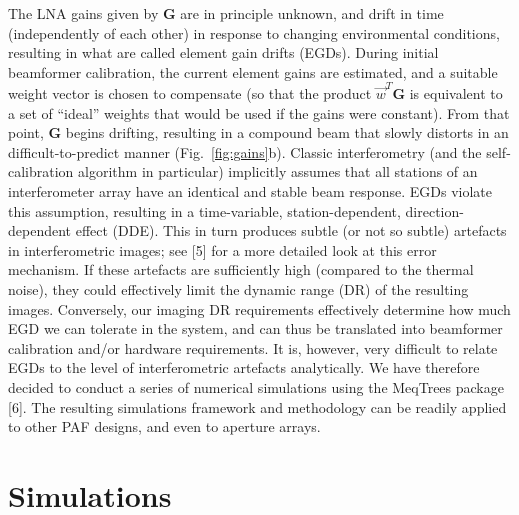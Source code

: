 \documentclass{aps2010} \special{papersize=8.5in,11in}
\begin{document}
The LNA gains given by $\mathbf{G}$ are in principle unknown, and drift in time (independently of each other) in response to changing environmental conditions, resulting in what are called element gain drifts (EGDs). During initial beamformer calibration, the current element gains are estimated, and a suitable weight vector is chosen to compensate (so that the product $\vec w^T\mathbf{G}$ is equivalent to a set of ``ideal'' weights that would be used if the gains were constant). From that point, $\mathbf{G}$ begins drifting, resulting in a compound beam that slowly distorts in an difficult-to-predict manner (Fig.~\ref{fig:gains}b). Classic interferometry (and the self-calibration algorithm in particular) implicitly assumes that all stations of an interferometer array have an identical and stable beam response. EGDs violate this assumption, resulting in a time-variable, station-dependent, direction-dependent effect (DDE). This in turn produces subtle (or not so subtle) artefacts in interferometric images; see [5] for a more detailed look at this error mechanism. If these artefacts are sufficiently high (compared to the thermal noise), they could effectively limit the dynamic range (DR) of the resulting images. Conversely, our imaging DR requirements effectively determine how much EGD we can tolerate in the system, and can thus be translated into beamformer calibration and/or hardware requirements. It is, however, very difficult to relate EGDs to the level of interferometric artefacts analytically. We have therefore decided to conduct a series of numerical simulations using the MeqTrees package [6]. The resulting simulations framework and methodology can be readily applied to other PAF designs, and even to aperture arrays.

\section{Simulations}
\end{document}
